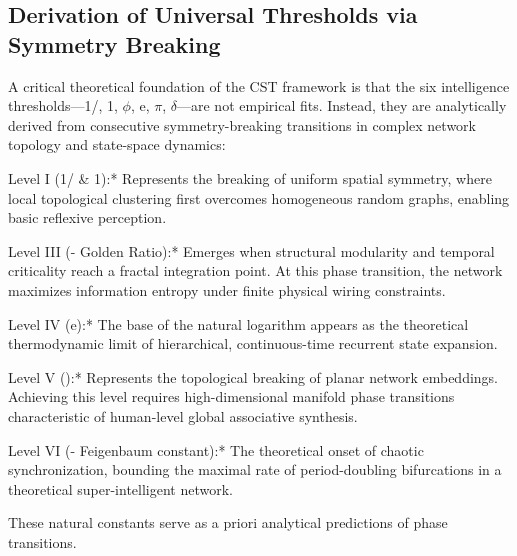 \documentclass[a4paper,12pt]{article}
\begin{document}
\subsection{Derivation of Universal Thresholds via Symmetry Breaking}

A critical theoretical foundation of the CST framework is that the six intelligence thresholds---{1/, 1, $\phi$, e, $\pi$, $\delta$}---are not empirical fits. Instead, they are analytically derived from consecutive symmetry-breaking transitions in complex network topology and state-space dynamics:


Level I (1/ \& 1):* Represents the breaking of uniform spatial symmetry, where local topological clustering first overcomes homogeneous random graphs, enabling basic reflexive perception.


Level III (\phi - Golden Ratio):* Emerges when structural modularity and temporal criticality reach a fractal integration point. At this phase transition, the network maximizes information entropy under finite physical wiring constraints.


Level IV (e):* The base of the natural logarithm appears as the theoretical thermodynamic limit of hierarchical, continuous-time recurrent state expansion.


Level V (\pi):* Represents the topological breaking of planar network embeddings. Achieving this level requires high-dimensional manifold phase transitions characteristic of human-level global associative synthesis.


Level VI (\delta - Feigenbaum constant):* The theoretical onset of chaotic synchronization, bounding the maximal rate of period-doubling bifurcations in a theoretical super-intelligent network.


These natural constants serve as a priori analytical predictions of phase transitions.
\end{document}
